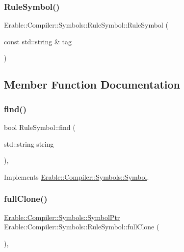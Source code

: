 \subsubsection{\texorpdfstring{RuleSymbol()}{RuleSymbol()}\hspace{0.1cm}{\footnotesize\ttfamily [3/3]}}
{\footnotesize\ttfamily Erable\+::\+Compiler\+::\+Symbols\+::\+Rule\+Symbol\+::\+Rule\+Symbol (\begin{DoxyParamCaption}\item[{const std\+::string \&}]{tag }\end{DoxyParamCaption})}



\subsection{Member Function Documentation}
\mbox{\label{class_erable_1_1_compiler_1_1_symbols_1_1_rule_symbol_a7af57723a2a59dbccf8cbe409f019a10}} 
\subsubsection{\texorpdfstring{find()}{find()}}
{\footnotesize\ttfamily bool Rule\+Symbol\+::find (\begin{DoxyParamCaption}\item[{std\+::string}]{string }\end{DoxyParamCaption})\hspace{0.3cm}{\ttfamily [override]}, {\ttfamily [virtual]}}



Implements \mbox{\hyperlink{class_erable_1_1_compiler_1_1_symbols_1_1_symbol_ac1d8b1392aef2e93bd47520a86f8617f}{Erable\+::\+Compiler\+::\+Symbols\+::\+Symbol}}.

\mbox{\label{class_erable_1_1_compiler_1_1_symbols_1_1_rule_symbol_a23ad141caa8003ab2597cbc8fae841b9}} 
\subsubsection{\texorpdfstring{fullClone()}{fullClone()}}
{\footnotesize\ttfamily \mbox{\hyperlink{namespace_erable_1_1_compiler_1_1_symbols_a8f0bc762f448ea4d84e8713ab3e140b9}{Erable\+::\+Compiler\+::\+Symbols\+::\+Symbol\+Ptr}} Erable\+::\+Compiler\+::\+Symbols\+::\+Rule\+Symbol\+::full\+Clone (\begin{DoxyParamCaption}{ }\end{DoxyParamCaption})\hspace{0.3cm}{\ttfamily [override]}, {\ttfamily [virtual]}}

